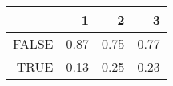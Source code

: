 \begin{table}[ht]
\centering
\begin{tabular}{rrrr}
  \hline
 & 1 & 2 & 3 \\ 
  \hline
FALSE & 0.87 & 0.75 & 0.77 \\ 
  TRUE & 0.13 & 0.25 & 0.23 \\ 
   \hline
\end{tabular}
\end{table}
